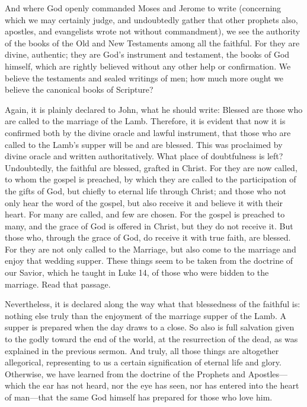 And where God openly commanded Moses and Jerome to write (concerning which we may certainly judge, and undoubtedly gather that other prophets also, apostles, and evangelists wrote not without commandment), we see the authority of the books of the Old and New Testaments among all the faithful. For they are divine, authentic; they are God’s instrument and testament, the books of God himself, which are rightly believed without any other help or confirmation. We believe the testaments and sealed writings of men; how much more ought we believe the canonical books of Scripture?

Again, it is plainly declared to John, what he should write: Blessed are those who are called to the marriage of the Lamb. Therefore, it is evident that now it is confirmed both by the divine oracle and lawful instrument, that those who are called to the Lamb’s supper will be and are blessed. This was proclaimed by divine oracle and written authoritatively. What place of doubtfulness is left? Undoubtedly, the faithful are blessed, grafted in Christ. For they are now called, to whom the gospel is preached, by which they are called to the participation of the gifts of God, but chiefly to eternal life through Christ; and those who not only hear the word of the gospel, but also receive it and believe it with their heart. For many are called, and few are chosen. For the gospel is preached to many, and the grace of God is offered in Christ, but they do not receive it. But those who, through the grace of God, do receive it with true faith, are blessed. For they are not only called to the Marriage, but also come to the marriage and enjoy that wedding supper. These things seem to be taken from the doctrine of our Savior, which he taught in Luke 14, of those who were bidden to the marriage. Read that passage.

Nevertheless, it is declared along the way what that blessedness of the faithful is: nothing else truly than the enjoyment of the marriage supper of the Lamb. A supper is prepared when the day draws to a close. So also is full salvation given to the godly toward the end of the world, at the resurrection of the dead, as was explained in the previous sermon. And truly, all those things are altogether allegorical, representing to us a certain signification of eternal life and glory. Otherwise, we have learned from the doctrine of the Prophets and Apostles—which the ear has not heard, nor the eye has seen, nor has entered into the heart of man—that the same God himself has prepared for those who love him.

